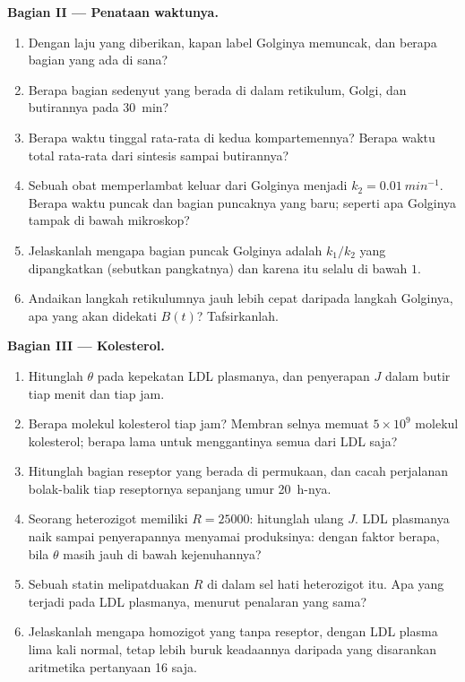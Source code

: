 \begin{problem}
\medskip
\noindent\textbf{Bagian II --- Penataan waktunya.}
\begin{enumerate}[resume]
  \item Dengan laju yang diberikan, kapan label Golginya memuncak, dan
        berapa bagian yang ada di sana?
  \item Berapa bagian sedenyut yang berada di dalam retikulum, Golgi, dan
        butirannya pada \qty{30}{min}?
  \item Berapa waktu tinggal rata-rata di kedua kompartemennya? Berapa
        waktu total rata-rata dari sintesis sampai butirannya?
  \item Sebuah obat memperlambat keluar dari Golginya menjadi $k_{2} = \qty{0.01}{min^{-1}}$.
        Berapa waktu puncak dan bagian puncaknya yang baru; seperti apa
        Golginya tampak di bawah mikroskop?
  \item Jelaskanlah mengapa bagian puncak Golginya adalah $k_{1}/k_{2}$ yang
        dipangkatkan (sebutkan pangkatnya) dan karena itu selalu di bawah $1$.
  \item Andaikan langkah retikulumnya jauh lebih cepat daripada langkah
        Golginya, apa yang akan didekati $B(t)$? Tafsirkanlah.
\end{enumerate}

\medskip
\noindent\textbf{Bagian III --- Kolesterol.}
\begin{enumerate}[resume]
  \item Hitunglah $\theta$ pada kepekatan LDL plasmanya, dan
        penyerapan $J$ dalam butir tiap menit dan tiap jam.
  \item Berapa molekul kolesterol tiap jam? Membran selnya
        memuat $5\times 10^{9}$ molekul kolesterol; berapa lama untuk
        menggantinya semua dari LDL saja?
  \item Hitunglah bagian reseptor yang berada di permukaan, dan
        cacah perjalanan bolak-balik tiap reseptornya sepanjang umur
        \qty{20}{h}-nya.
  \item Seorang heterozigot memiliki $R = \num{25000}$: hitunglah ulang $J$.
        LDL plasmanya naik sampai penyerapannya menyamai produksinya: dengan
        faktor berapa, bila $\theta$ masih jauh di bawah kejenuhannya?
  \item Sebuah statin melipatduakan $R$ di dalam sel hati heterozigot itu. Apa
        yang terjadi pada LDL plasmanya, menurut penalaran yang sama?
  \item Jelaskanlah mengapa homozigot yang tanpa reseptor, dengan LDL plasma
        lima kali normal, tetap lebih buruk keadaannya daripada yang
        disarankan aritmetika pertanyaan 16 saja.
\end{enumerate}


\end{problem}
